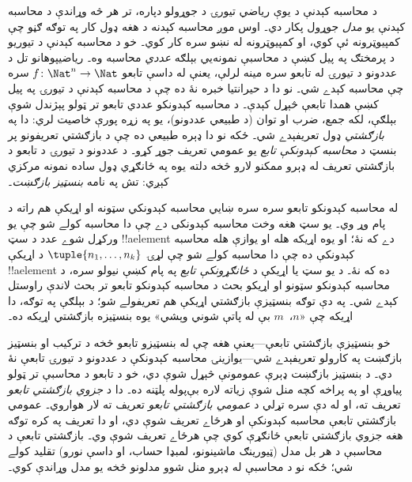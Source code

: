 \documentclass[../../../include/open-logic-section]{subfiles}
\begin{document}

د محاسبه کېدنې د يوې رياضي تيورۍ د جوړولو دپاره، تر هر څه وړاندې د
محاسبه کېدنې يو \emph{مدل} جوړول پکار دي۔ اوس موږ محاسبه کېدنه د هغه
ډول کار په توګه ګڼو چې کمپيوټرونه ئې کوي، او کمپيوټرونه له نښو سره
کار کوي۔ خو د محاسبه کېدنې د تيوريو د پرمختګ په پيل کښې د محاسبې
نمونه‌يي بېلګه \emph{عددي} محاسبه وه۔ رياضيپوهانو تل د عددونو د
تيورۍ له تابعو سره مينه لرلې، يعنې له داسې تابعو $f\colon \Nat^n \to
\Nat$ سره چې محاسبه کېدے شي۔ نو دا د حيرانتيا خبره نۀ ده چې د
محاسبه کېدنې د تيورۍ په پيل کښې همدا تابعې څېړل کېدې۔ د محاسبه
کېدونکو عددي تابعو تر ټولو پېژندل شوې بېلګې، لکه جمع، ضرب او توان
(د طبيعي عددونو)، يو په زړه پورې خاصيت لري: دا په
\emph{بازګشتي} ډول تعريفېدے شي۔ ځکه نو دا ډېره طبيعي ده چې د
بازګشتي تعريفونو پر بنسټ د \emph{محاسبه کېدونکې تابع} يو عمومي تعريف
جوړ کړو۔ د عددونو د تيورۍ د تابعو د بازګشتي تعريف له ډېرو ممکنو لارو
څخه دلته يوه په ځانګړي ډول ساده نمونه مرکزي کېږي: تش په نامه
\emph{بنسټيز بازګښت}۔

له محاسبه کېدونکو تابعو سره سره ښايي محاسبه کېدونکي سټونه او اړيکې
هم راته د پام وړ وي۔ يو سټ هغه وخت محاسبه کېدونکی دے چې دا محاسبه
کولے شو چې يو ورکړل شوے عدد د سټ !!a{element} دے که نۀ؛ او يوه
اړيکه هله او يوازې هله محاسبه کېدونکې ده چې دا محاسبه کولے شو چې
لړۍ $\tuple{n_1, \dots, n_k}$ د اړيکې !!a{element} ده که نۀ۔ د يو
سټ يا اړيکې د \emph{ځانګړونکې تابع} په پام کښې نيولو سره، د محاسبه
کېدونکو سټونو او اړيکو بحث د محاسبه کېدونکو تابعو تر بحث لاندې
راوستل کېدے شي۔ په دې توګه بنسټيزې بازګشتي اړيکې هم تعريفولے شو؛ د
بېلګې په توګه، دا اړيکه چې «$n$،~$m$ بې له پاتې شوني وېشي» يوه
بنسټيزه بازګشتي اړيکه ده۔

خو بنسټيزې بازګشتي تابعې---يعنې هغه چې له بنسټيزو تابعو څخه د
ترکيب او بنسټيز بازګښت په کارولو تعريفېدے شي---يوازينۍ محاسبه
کېدونکې د عددونو د تيورۍ تابعې نۀ دي۔ د بنسټيز بازګښت ډېرې عمومونې
څېړل شوې دي، خو د تابعو د محاسبې تر ټولو پياوړې او په پراخه کچه منل
شوې زياته لاره بې‌پوله پلټنه ده۔ دا د \emph{جزوي بازګشتي تابعو}
تعريف ته، او له دې سره تړلي د \emph{عمومي بازګشتي تابعو} تعريف ته
لار هواروي۔ عمومي بازګشتي تابعې محاسبه کېدونکې او هرځاے تعريف شوې
دي، او دا تعريف په کره توګه هغه جزوي بازګشتي تابعې ځانګړې کوي چې
هرځاے تعريف شوې وي۔ بازګشتي تابعې د محاسبې د هر بل مدل (ټيورينګ
ماشينونو، لمبډا حساب، او داسې نورو) تقليد کولے شي؛ ځکه نو د محاسبې
له ډېرو منل شوو مدلونو څخه يو مدل وړاندې کوي۔
\end{document}
